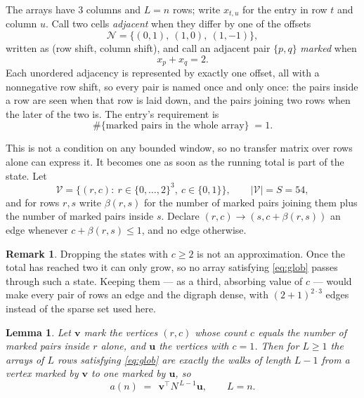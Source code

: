 \documentclass[11pt,a4paper]{article}
\theoremstyle{plain}
\newtheorem{lemma}[theorem]{Lemma}
\theoremstyle{definition}
\newtheorem{remark}[theorem]{Remark}
\begin{document}
The arrays have $3$ columns and $L=n$ rows; write $x_{t,u}$ for the entry in
row $t$ and column $u$. Call two cells \emph{adjacent} when they differ by one of the
offsets
\[
\mathcal N=\{(0,1),\ (1,0),\ (1,-1)\},
\]
written as (row shift, column shift), and call an adjacent pair $\{p,q\}$
\emph{marked} when
\[
x_{p}+x_{q}=2 .
\]
Each unordered adjacency is represented by exactly one offset, all with a nonnegative row
shift, so every pair is named once and only once: the pairs inside a row are seen when
that row is laid down, and the pairs joining two rows when the later of the two is. The
entry's requirement is
\begin{equation}\label{eq:glob}
\#\{\text{marked pairs in the whole array}\}\;=1.
\end{equation}

This is not a condition on any bounded window, so no transfer matrix over rows alone can
express it. It becomes one as soon as the running total is part of the state. Let
\[
\mathcal V=\bigl\{(r,c):\ r\in\{0,\dots,2\}^{3},\ c\in\{0,1\}\bigr\},
\qquad |\mathcal V|=S=54,
\]
and for rows $r,s$ write $\beta(r,s)$ for the number of marked pairs joining them plus the
number of marked pairs inside $s$. Declare $(r,c)\to(s,c+\beta(r,s))$ an edge whenever
$c+\beta(r,s)\le1$, and no edge otherwise.

\begin{remark}
Dropping the states with $c\ge2$ is not an approximation. Once the total has reached two it
can only grow, so no array satisfying \eqref{eq:glob} passes through such a state. Keeping
them --- as a third, absorbing value of $c$ --- would make every pair of rows an edge and
the digraph dense, with $(2+1)^{2\cdot3}$ edges instead of the sparse set used here.
\end{remark}

\begin{lemma}\label{lem:walk}
Let $\mathbf{v}$ mark the vertices $(r,c)$ whose count $c$ equals the number of marked pairs
inside $r$ alone, and $\mathbf{u}$ the vertices with $c=1$. Then for $L\ge1$ the arrays
of $L$ rows satisfying \eqref{eq:glob} are exactly the walks of length $L-1$ from a
vertex marked by $\mathbf{v}$ to one marked by $\mathbf{u}$, so
\[
a(n)\;=\;\,\mathbf{v}^{\!\top}N^{\,L-1}\mathbf{u},\qquad L=n .
\]
\end{lemma}
\end{document}

